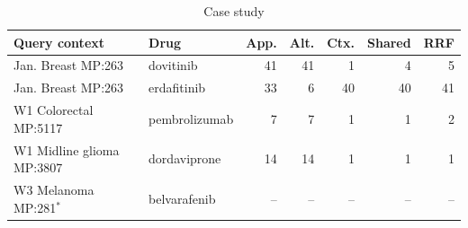 \begin{table}[t]
\centering
\caption{Case study}
\label{tab:cases}
\small
\setlength{\tabcolsep}{2pt}
\begin{tabular}{llrrrrr}
\toprule
Query context & Drug & App. & Alt. & Ctx. & Shared & RRF \\
\midrule
Jan. Breast MP:263 & dovitinib & 41 & 41 & 1 & 4 & 5 \\
Jan. Breast MP:263 & erdafitinib & 33 & 6 & 40 & 40 & 41 \\
W1 Colorectal MP:5117 & pembrolizumab & 7 & 7 & 1 & 1 & 2 \\
W1 Midline glioma MP:3807 & dordaviprone & 14 & 14 & 1 & 1 & 1 \\
W3 Melanoma MP:281$^*$ & belvarafenib & -- & -- & -- & -- & -- \\
\bottomrule
\end{tabular}
\end{table}
